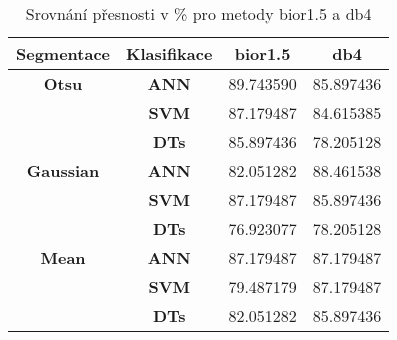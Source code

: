 \capstartfalse
\begin{table}[!htbp]
\centering
\begin{tabular}{|c|c|c|c|}
\hline
\textbf{Segmentace} & \textbf{Klasifikace} & \textbf{bior1.5} & \textbf{db4} \\ \hline
\textbf{Otsu}       & \textbf{ANN}         & 89.743590        & 85.897436    \\ \hline
\textbf{}           & \textbf{SVM}         & 87.179487        & 84.615385    \\ \hline
\textbf{}           & \textbf{DTs}         & 85.897436        & 78.205128    \\ \hline
\textbf{Gaussian}   & \textbf{ANN}         & 82.051282        & 88.461538    \\ \hline
\textbf{}           & \textbf{SVM}         & 87.179487        & 85.897436    \\ \hline
\textbf{}           & \textbf{DTs}         & 76.923077        & 78.205128    \\ \hline
\textbf{Mean}       & \textbf{ANN}         & 87.179487        & 87.179487    \\ \hline
\textbf{}           & \textbf{SVM}         & 79.487179        & 87.179487    \\ \hline
\textbf{}           & \textbf{DTs}         & 82.051282        & 85.897436    \\ \hline
\end{tabular}
\caption{Srovnání přesnosti v \% pro metody bior1.5 a db4 }
\end{table}
\capstarttrue



